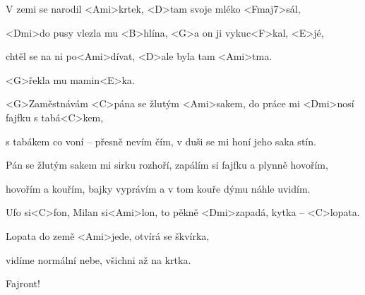 

\zs
V zemi se narodil <Ami>krtek,
<D>tam svoje mléko <Fmaj7>sál,

<Dmi>do pusy vlezla mu <B>hlína,
<G>a on ji vykuc<F>kal, <E>jé,

chtěl se na ni po<Ami>dívat,
<D>ale byla tam <Ami>tma.

<G>řekla mu mamin<E>ka.

\ks
\zs

<G>Zaměstnávám <C>pána se žlutým <Ami>sakem,
do práce mi <Dmi>nosí fajfku s tabá<C>kem,

s tabákem co voní -- přesně nevím čím,
v duši se mi honí jeho saka stín.

Pán se žlutým sakem mi sirku rozhoří,
zapálím si fajfku a plynně hovořím,

hovořím a kouřím, bajky vyprávím
a v tom kouře dýmu náhle uvidím.

\ks
\zs

Ufo si<C>fon, Milan si<Ami>lon,
to pěkně <Dmi>zapadá, kytka -- <C>lopata.

Lopata do země <Ami>jede,
otvírá se škvírka,

vidíme normální nebe,
všichni až na krtka.

Fajront!
\ks

\kp

